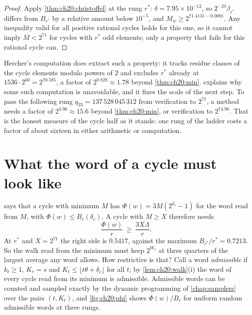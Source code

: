 \begin{proof}
Apply \cref{thm:ch20:christoffel} at the rung $r^\ast$: $\delta=7.95\times10^{-12}$, so $2^{-2\delta}\beta_{r^\ast}$ differs from $B_{r^\ast}$ by a relative amount below $10^{-5}$, and $M_w\ge2^{71.4131-0.0001}$. Any inequality valid for all positive rational cycles holds for this one, so it cannot imply $M<2^{71}$ for cycles with $r^\ast$ odd elements; only a property that fails for this rational cycle can.
\end{proof}

Hercher's computation does extract such a property: it tracks residue classes of the cycle elements modulo powers of $2$ and excludes $r^\ast$ already at $1536\cdot2^{60}=2^{70.585}$, a factor of $2^{0.828}\approx1.78$ beyond \cref{thm:ch20:min}.  explains why some such computation is unavoidable, and it fixes the scale of the next step. To pass the following rung $q_{23}=137\,528\,045\,312$ from verification to $2^{71}$, a method needs a factor of $2^{3.96}\approx15.6$ beyond \cref{thm:ch20:min}, or verification to $2^{74.96}$. That is the honest measure of the cycle half as it stands: one rung of the ladder costs a factor of about sixteen in either arithmetic or computation.

\section{What the word of a cycle must look like}\label{sec:ch20:band}

 says that a cycle with minimum $M$ has $\Phi(w)=3M(2^{\delta_c}-1)$ for the word read from $M$, with $\Phi(w)\le B_r(\delta_c)$. A cycle with $M\ge X$ therefore needs
\begin{equation}\label{eq:ch20:need}
\frac{\Phi(w)}{r}\ \ge\ \frac{3X\Lambda}{r}.
\end{equation}
At $r^\ast$ and $X=2^{71}$ the right side is $0.5417$, against the maximum $B_{r^\ast}/r^\ast=0.7213$. So the walk read from the minimum must keep $2^{W_t}$ at three quarters of the largest average any word allows. How restrictive is that? Call a word \emph{admissible} if $k_t\ge1$, $K_r=s$ and $K_t\le\lfloor t\theta+\delta_c\rfloor$ for all $t$; by \cref{lem:ch20:walk}(i) the word of every cycle read from its minimum is admissible. Admissible words can be counted and sampled exactly by the dynamic programming of \cref{chap:samplers} over the pairs $(t,K_t)$, and \cref{fig:ch20:phi} shows $\Phi(w)/B_r$ for uniform random admissible words at three rungs.

